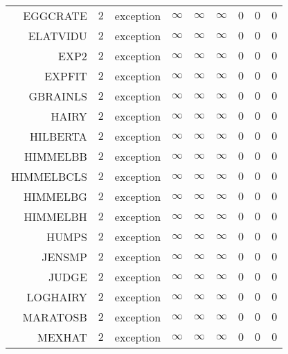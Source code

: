 \begin{longtable}{rrrrrrrrr}
EGGCRATE & \(     2\) & exception & \(\infty\) & \(\infty\) & \(\infty\) & \(     0\) & \(     0\) & \(     0\) \\
ELATVIDU & \(     2\) & exception & \(\infty\) & \(\infty\) & \(\infty\) & \(     0\) & \(     0\) & \(     0\) \\
EXP2 & \(     2\) & exception & \(\infty\) & \(\infty\) & \(\infty\) & \(     0\) & \(     0\) & \(     0\) \\
EXPFIT & \(     2\) & exception & \(\infty\) & \(\infty\) & \(\infty\) & \(     0\) & \(     0\) & \(     0\) \\
GBRAINLS & \(     2\) & exception & \(\infty\) & \(\infty\) & \(\infty\) & \(     0\) & \(     0\) & \(     0\) \\
HAIRY & \(     2\) & exception & \(\infty\) & \(\infty\) & \(\infty\) & \(     0\) & \(     0\) & \(     0\) \\
HILBERTA & \(     2\) & exception & \(\infty\) & \(\infty\) & \(\infty\) & \(     0\) & \(     0\) & \(     0\) \\
HIMMELBB & \(     2\) & exception & \(\infty\) & \(\infty\) & \(\infty\) & \(     0\) & \(     0\) & \(     0\) \\
HIMMELBCLS & \(     2\) & exception & \(\infty\) & \(\infty\) & \(\infty\) & \(     0\) & \(     0\) & \(     0\) \\
HIMMELBG & \(     2\) & exception & \(\infty\) & \(\infty\) & \(\infty\) & \(     0\) & \(     0\) & \(     0\) \\
HIMMELBH & \(     2\) & exception & \(\infty\) & \(\infty\) & \(\infty\) & \(     0\) & \(     0\) & \(     0\) \\
HUMPS & \(     2\) & exception & \(\infty\) & \(\infty\) & \(\infty\) & \(     0\) & \(     0\) & \(     0\) \\
JENSMP & \(     2\) & exception & \(\infty\) & \(\infty\) & \(\infty\) & \(     0\) & \(     0\) & \(     0\) \\
JUDGE & \(     2\) & exception & \(\infty\) & \(\infty\) & \(\infty\) & \(     0\) & \(     0\) & \(     0\) \\
LOGHAIRY & \(     2\) & exception & \(\infty\) & \(\infty\) & \(\infty\) & \(     0\) & \(     0\) & \(     0\) \\
MARATOSB & \(     2\) & exception & \(\infty\) & \(\infty\) & \(\infty\) & \(     0\) & \(     0\) & \(     0\) \\
MEXHAT & \(     2\) & exception & \(\infty\) & \(\infty\) & \(\infty\) & \(     0\) & \(     0\) & \(     0\) \\

\end{longtable}
